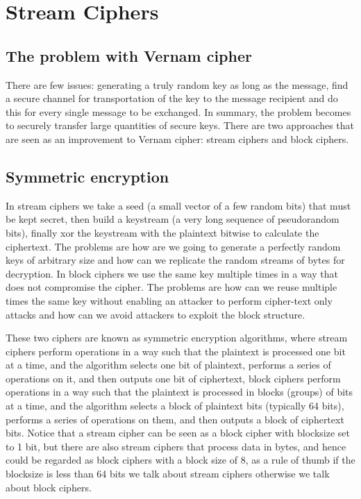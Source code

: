 \chapter{Stream Ciphers}

\section{The problem with Vernam cipher}

There are few issues: generating a truly random key as long as the message, find a secure channel for transportation of the key to the message recipient and do this for every single message to be exchanged. In summary, the problem becomes to securely transfer large quantities of secure keys. There are two approaches that are seen as an improvement to Vernam cipher: stream ciphers and block ciphers.


\section{Symmetric encryption}
In stream ciphers we take a seed (a small vector of a few random bits) that must be kept secret, then build a keystream (a very long sequence of pseudorandom bits), finally xor the keystream with the plaintext bitwise to calculate the ciphertext. The problems are how are we going to generate a perfectly random keys of arbitrary size and how can we replicate the random streams of bytes for decryption.
In block ciphers we use the same key multiple times in a way that does not compromise the cipher. The problems are how can we reuse multiple times the same key without enabling an attacker to perform cipher-text only attacks and how can we avoid attackers to exploit the block structure.

These two ciphers are known as symmetric encryption algorithms, where stream ciphers perform operations in a way such that the plaintext is processed one bit at a time, and the algorithm selects one bit of plaintext, performs a series of operations on it, and then outputs one bit of ciphertext, block ciphers perform operations in a way such that the plaintext is processed in blocks (groups) of bits at a time, and the algorithm selects a block of plaintext bits (typically 64 bits), performs a series of operations on them, and then outputs a block of ciphertext bits.
Notice that a stream cipher can be seen as a block cipher with blocksize set to 1 bit, but there are also stream ciphers that process data in bytes, and hence could be regarded as block ciphers with a block size of 8, as a rule of thumb if the blocksize is less than 64 bits we talk about stream ciphers otherwise we talk about block ciphers.



